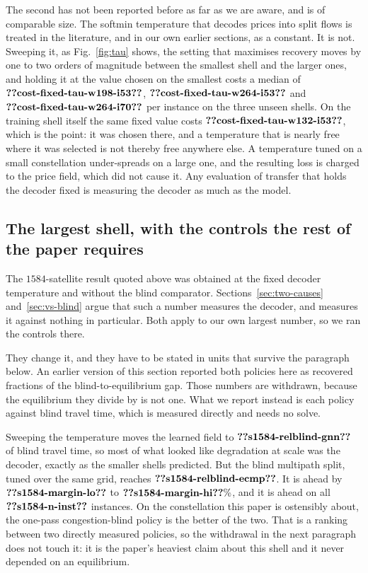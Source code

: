 \documentclass[journal]{IEEEtran}
\begin{document}
The second has not been reported before as far as we are aware, and is of comparable size. The
softmin temperature that decodes prices into split flows is treated in the literature, and in our
own earlier sections, as a constant. It is not. Sweeping it, as Fig.~\ref{fig:tau} shows, the
setting that maximises recovery
moves by one to two orders of magnitude between the smallest shell and the larger ones, and holding
it at the value chosen on the smallest costs a median of $\clm{cost-fixed-tau-w198-i53}$, $\clm{cost-fixed-tau-w264-i53}$ and $\clm{cost-fixed-tau-w264-i70}$ per instance
on the three unseen shells. On the training shell itself the same fixed value costs $\clm{cost-fixed-tau-w132-i53}$, which
is the point: it was chosen there, and a temperature that is nearly free where it was selected is
not thereby free anywhere else. A temperature tuned on a small constellation under-spreads on a large
one, and the resulting loss is charged to the price field, which did not cause it. Any evaluation
of transfer that holds the decoder fixed is measuring the decoder as much as the model.

\subsection{The largest shell, with the controls the rest of the paper requires}\label{sec:s1584}
The $1584$-satellite result quoted above was obtained at the fixed decoder temperature and
without the blind comparator. Sections~\ref{sec:two-causes} and~\ref{sec:vs-blind} argue that such
a number measures the decoder, and measures it against nothing in particular. Both apply to our own
largest number, so we ran the controls there.

They change it, and they have to be stated in units that survive the paragraph below. An
earlier version of this section reported both policies here as recovered fractions of the
blind-to-equilibrium gap. Those numbers are withdrawn, because the equilibrium they divide by
is not one. What we report instead is each policy against blind travel time, which is measured
directly and needs no solve.

Sweeping the temperature moves the learned field to $\clm{s1584-relblind-gnn}$ of blind travel
time, so most of what looked like degradation at scale was the decoder, exactly as the smaller
shells predicted. But the blind multipath split, tuned over the same grid, reaches
$\clm{s1584-relblind-ecmp}$. It is ahead by $\clm{s1584-margin-lo}$ to
$\clm{s1584-margin-hi}\%$, and it is ahead on all $\clm{s1584-n-inst}$ instances. On the
constellation this paper is ostensibly about, the one-pass congestion-blind policy is the better
of the two. That is a ranking between two directly measured policies, so the withdrawal in the
next paragraph does not touch it: it is the paper's heaviest claim about this shell and it never
depended on an equilibrium.
\end{document}
